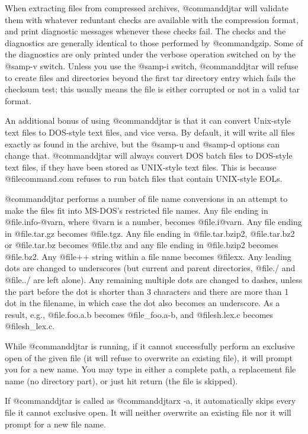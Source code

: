 When extracting files from compressed archives, @command{djtar} will
validate them with whatever reduntant checks are available with the
compression format, and print diagnostic messages whenever these checks
fail.  The checks and the diagnostics are generally identical to those
performed by @command{gzip}.  Some of the diagnostics are only printed under
the verbose operation switched on by the @samp{-v} switch.  Unless you use
the @samp{-i} switch, @command{djtar} will refuse to create files and
directories beyond the first tar directory entry which fails the checksum
test; this usually means the file is either corrupted or not in a valid
tar format.

An additional bonus of using @command{djtar} is that it can convert
Unix-style text files to DOS-style text files, and vice versa.  By
default, it will write all files exactly as found in the archive, but the
@samp{-u} and @samp{-d} options can change that.  @command{djtar} will
always convert DOS batch files to DOS-style text files, if they
have been stored as UNIX-style text files.  This is because
@file{command.com} refuses to run batch files that contain
UNIX-style EOLs.

@command{djtar} performs a number of file name conversions in an attempt
to make the files fit into MS-DOS's restricted file names.  Any file
ending in @file{.info-@var{n}}, where @var{n} is a number, becomes
@file{.i@var{n}}.  Any file ending in @file{.tar.gz} becomes
@file{.tgz}.  Any file ending in @file{.tar.bzip2}, @file{.tar.bz2}
or @file{.tar.bz} becomes @file{.tbz} and any file ending in
@file{.bzip2} becomes @file{.bz2}.  Any @file{++} string within
a file name becomes @file{xx}.
Any leading dots are changed to underscores (but current and parent
directories, @file{./} and @file{../} are left alone).  Any remaining
multiple dots are changed to dashes, unless the part before the dot is
shorter than 3 characters and there are more than 1 dot in the filename,
in which case the dot also becomes an underscore.  As a result, e.g.,
@file{.foo.a.b} becomes @file{_foo.a-b}, and @file{sh.lex.c} becomes
@file{sh_lex.c}.

While @command{djtar} is running, if it cannot successfully perform an
exclusive open of the given file (it will refuse to overwrite an
existing file), it will prompt you for a new name.  You may type in
either a complete path, a replacement file name (no directory part), or
just hit return (the file is skipped).

If @command{djtar} is called as @command{djtarx -a}, it automatically
skips every file it cannot exclusive open.  It will neither overwrite
an existing file nor it will prompt for a new file name.


